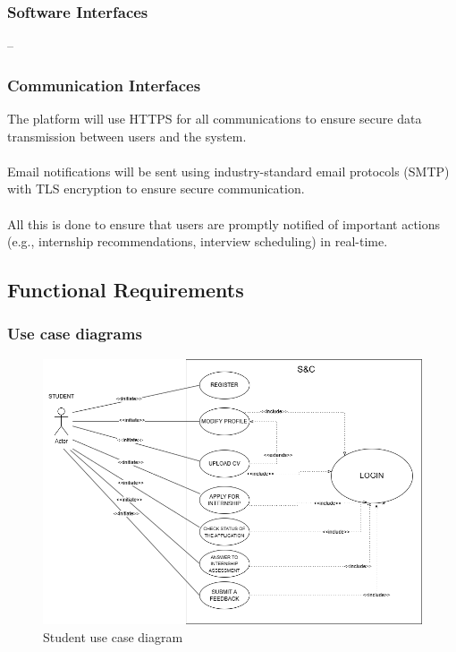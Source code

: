 \subsubsection{Software Interfaces}

--

\subsubsection{Communication Interfaces}

The platform will use HTTPS for all communications to ensure secure data transmission between users and the system.\\ \\
Email notifications will be sent using industry-standard email protocols (SMTP) with TLS encryption to ensure secure communication. \\ \\
All this is done to ensure that users are promptly notified of important actions (e.g., internship recommendations, interview scheduling) in real-time.
\newpage
\subsection{Functional Requirements}
\subsubsection{Use case diagrams}
\begin{figure}[ht!]
    \centering
    \includegraphics[scale=0.40]{Images/ImagesRASD/ScenariosStateDiagram-UseCaseDiagrams_Student.drawio.png}
    \caption{Student use case diagram}
\end{figure}

